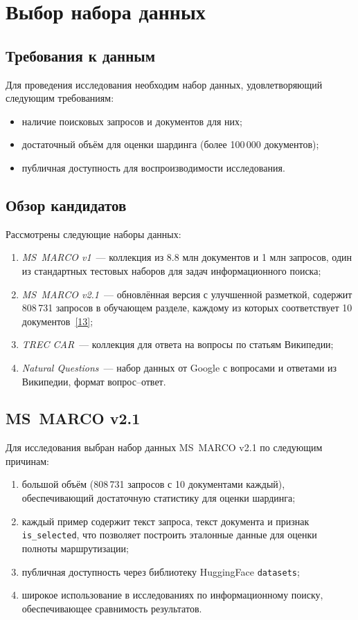 \documentclass[14pt, a4paper]{article}
\newcommand{\srcref}[1]{\hyperlink{src:i#1}{[#1]}}
\begin{document}
	\section{Выбор набора данных}

	\subsection{Требования к данным}

	Для проведения исследования необходим набор данных, удовлетворяющий следующим требованиям:
	\begin{itemize}
		\item наличие поисковых запросов и документов для них;
		\item достаточный объём для оценки шардинга (более 100\,000 документов);
		\item публичная доступность для воспроизводимости исследования.
	\end{itemize}

	\subsection{Обзор кандидатов}

	Рассмотрены следующие наборы данных:
	\begin{enumerate}
		\item \textit{MS~MARCO v1}~--- коллекция из 8.8 млн документов и 1 млн запросов, один из стандартных тестовых наборов для задач информационного поиска;
		\item \textit{MS~MARCO v2.1}~--- обновлённая версия с улучшенной разметкой, содержит 808\,731 запросов в обучающем разделе, каждому из которых соответствует 10 документов~\srcref{13};
		\item \textit{TREC CAR}~--- коллекция для ответа на вопросы по статьям Википедии;
		\item \textit{Natural Questions}~--- набор данных от Google с вопросами и ответами из Википедии, формат вопрос--ответ.
	\end{enumerate}

	\subsection{MS~MARCO v2.1}

	Для исследования выбран набор данных MS~MARCO v2.1 по следующим причинам:
	\begin{enumerate}
		\item большой объём (808\,731 запросов с 10 документами каждый), обеспечивающий достаточную статистику для оценки шардинга;
		\item каждый пример содержит текст запроса, текст документа и признак \texttt{is\_selected}, что позволяет построить эталонные данные для оценки полноты маршрутизации;
		\item публичная доступность через библиотеку HuggingFace \texttt{datasets};
		\item широкое использование в исследованиях по информационному поиску, обеспечивающее сравнимость результатов.
	\end{enumerate}
\end{document}
